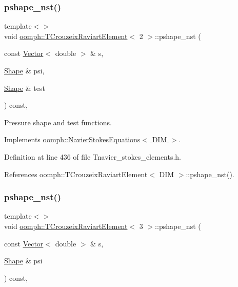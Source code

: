 \subsubsection{\texorpdfstring{pshape\+\_\+nst()}{pshape\_nst()}\hspace{0.1cm}{\footnotesize\ttfamily [4/6]}}
{\footnotesize\ttfamily template$<$$>$ \\
void \hyperlink{classoomph_1_1TCrouzeixRaviartElement}{oomph\+::\+T\+Crouzeix\+Raviart\+Element}$<$ 2 $>$\+::pshape\+\_\+nst (\begin{DoxyParamCaption}\item[{const \hyperlink{classoomph_1_1Vector}{Vector}$<$ double $>$ \&}]{s,  }\item[{\hyperlink{classoomph_1_1Shape}{Shape} \&}]{psi,  }\item[{\hyperlink{classoomph_1_1Shape}{Shape} \&}]{test }\end{DoxyParamCaption}) const\hspace{0.3cm}{\ttfamily [inline]}, {\ttfamily [virtual]}}



Pressure shape and test functions. 



Implements \hyperlink{classoomph_1_1NavierStokesEquations_a55f96a5c9f985476aeb145f683d63001}{oomph\+::\+Navier\+Stokes\+Equations$<$ D\+I\+M $>$}.



Definition at line 436 of file Tnavier\+\_\+stokes\+\_\+elements.\+h.



References oomph\+::\+T\+Crouzeix\+Raviart\+Element$<$ D\+I\+M $>$\+::pshape\+\_\+nst().

\mbox{\label{classoomph_1_1TCrouzeixRaviartElement_a00b50ccb04f8c64a3764e0cb022a1475}} 
\subsubsection{\texorpdfstring{pshape\+\_\+nst()}{pshape\_nst()}\hspace{0.1cm}{\footnotesize\ttfamily [5/6]}}
{\footnotesize\ttfamily template$<$$>$ \\
void \hyperlink{classoomph_1_1TCrouzeixRaviartElement}{oomph\+::\+T\+Crouzeix\+Raviart\+Element}$<$ 3 $>$\+::pshape\+\_\+nst (\begin{DoxyParamCaption}\item[{const \hyperlink{classoomph_1_1Vector}{Vector}$<$ double $>$ \&}]{s,  }\item[{\hyperlink{classoomph_1_1Shape}{Shape} \&}]{psi }\end{DoxyParamCaption}) const\hspace{0.3cm}{\ttfamily [inline]}, {\ttfamily [virtual]}}

